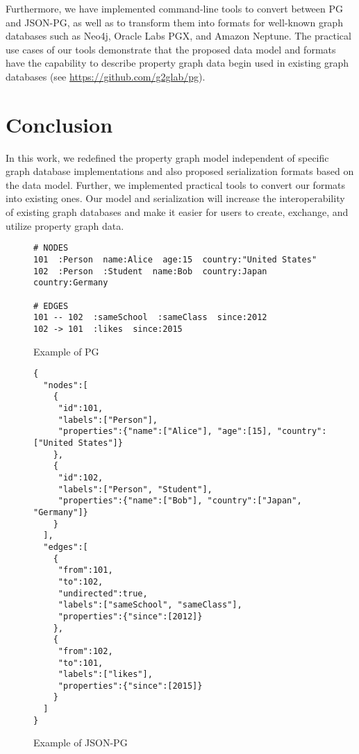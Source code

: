 \documentclass[runningheads]{llncs}
\begin{document}
Furthermore, we have implemented command-line tools to convert between PG and JSON-PG, as well as to transform them into formats for well-known graph databases such as Neo4j, Oracle Labs PGX, and Amazon Neptune. The practical use cases of our tools demonstrate that the proposed data model and formats have the capability to describe property graph data begin used in existing graph databases (see \url{https://github.com/g2glab/pg}).

\section{Conclusion}
In this work, we redefined the property graph model independent of specific graph database implementations and also proposed serialization formats based on the data model. Further, we implemented practical tools to convert our formats into existing ones. Our model and serialization will increase the interoperability of existing graph databases and make it easier for users to create, exchange, and utilize property graph data.

\begin{figure}[!t]
\begin{scriptsize}
\begin{verbatim}
# NODES
101  :Person  name:Alice  age:15  country:"United States"
102  :Person  :Student  name:Bob  country:Japan  country:Germany

# EDGES
101 -- 102  :sameSchool  :sameClass  since:2012
102 -> 101  :likes  since:2015
\end{verbatim}
\end{scriptsize}
\caption{Example of PG}
\label{fig:example-pg}
\end{figure}

\begin{figure}[!t]
\begin{scriptsize}
\begin{verbatim}
{
  "nodes":[
    {
     "id":101,
     "labels":["Person"],
     "properties":{"name":["Alice"], "age":[15], "country":["United States"]}
    },
    {
     "id":102,
     "labels":["Person", "Student"],
     "properties":{"name":["Bob"], "country":["Japan", "Germany"]}
    }
  ],
  "edges":[
    {
     "from":101,
     "to":102,
     "undirected":true,
     "labels":["sameSchool", "sameClass"],
     "properties":{"since":[2012]}
    },
    {
     "from":102,
     "to":101,
     "labels":["likes"],
     "properties":{"since":[2015]}
    }
  ]
}
\end{verbatim}
\end{scriptsize}
\caption{Example of JSON-PG}
\label{fig:example-json}
\end{figure}
\end{document}
